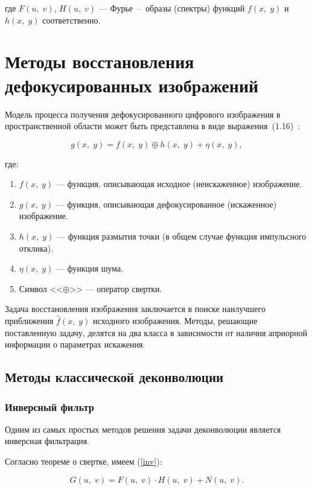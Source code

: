 где $F(u,\;v)$, $H(u,\;v)$ --- Фурье~--~образы (спектры) функций $f(x,\;y)$ и $h(x,\;y)$ соответственно.

\clearpage

\section{Методы восстановления дефокусированных изображений}

Модель процесса получения дефокусированного цифрового изображения в пространственной области может быть представлена в виде выражения~(1.16)~\cite{equ}:

\begin{equation}
	g(x,\;y) = f(x,\;y) \oplus h(x,\;y) + \eta(x,\;y), 
\end{equation}

где:

\begin{enumerate}
	\item $f(x,\;y)$ --- функция, описывающая исходное (неискаженное) изображение.
	\item $g(x,\;y)$ --- функция, описывающая дефокусированное (искаженное) изображение.
	\item $h(x,\;y)$ --- функция размытия точки (в общем случае функция импульсного отклика).
	\item $\eta(x,\;y)$ --- функция шума.
	\item Символ <<$\oplus$>> --- оператор свертки. 
\end{enumerate}

Задача восстановления изображения заключается в поиске наилучшего приближения $\hat{f}(x,\;y)$ исходного изображения. Методы, решающие поставленную задачу, делятся на два класса в зависимости от наличия априорной информации о параметрах искажения.

\subsection{Методы классической деконволюции}

\subsubsection{Инверсный фильтр}

Одним из самых простых методов решения задачи деконволюции является инверсная фильтрация.

Согласно теореме о свертке, имеем (\ref{inv}):

\begin{equation}\label{inv}
	G(u,\;v) = F(u,\;v) \cdot H(u,\;v) + N(u,\;v).
\end{equation}

